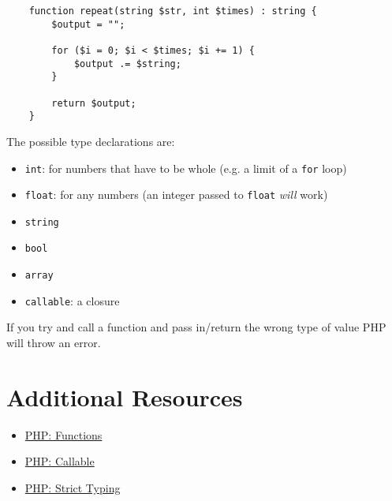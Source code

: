 \begin{verbatim}
    function repeat(string $str, int $times) : string {
        $output = "";

        for ($i = 0; $i < $times; $i += 1) {
            $output .= $string;
        }

        return $output;
    }
\end{verbatim}

The possible type declarations are:

\begin{itemize}
    \item \texttt{int}: for numbers that have to be whole (e.g. a limit of a \texttt{for} loop)
    \item \texttt{float}: for any numbers (an integer passed to \texttt{float} \textit{will} work)
    \item \texttt{string}
    \item \texttt{bool}
    \item \texttt{array}
    \item \texttt{callable}: a closure
\end{itemize}

If you try and call a function and pass in/return the wrong type of value PHP will throw an error.


\section{Additional Resources}

\begin{itemize}[leftmargin=*]
    \item \href{http://www.php.net/manual/en/functions.user-defined.php}{PHP: Functions}
    \item \href{http://www.php.net/manual/en/language.types.callable.php}{PHP: Callable}
    \item \href{http://www.php.net/manual/en/functions.arguments.php#functions.arguments.type-declaration.strict}{PHP: Strict Typing}
\end{itemize}
